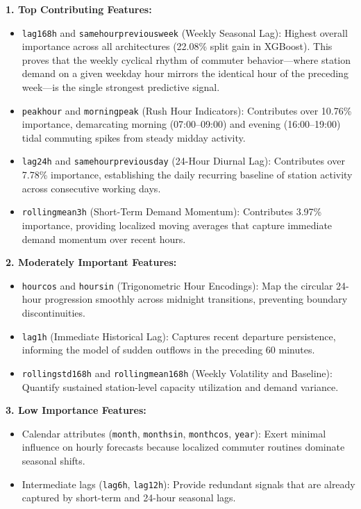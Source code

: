 \documentclass[12pt, a4paper]{article}
\renewcommand{\_}{\textunderscore\allowbreak}
\begin{document}
\noindent \textbf{1. Top Contributing Features:}
\begin{itemize}
    \item \texttt{lag\_168h} and \texttt{same\_hour\_previous\_week} (Weekly Seasonal Lag): Highest overall importance across all architectures (22.08\% split gain in XGBoost). This proves that the weekly cyclical rhythm of commuter behavior---where station demand on a given weekday hour mirrors the identical hour of the preceding week---is the single strongest predictive signal.
    \item \texttt{peak\_hour} and \texttt{morning\_peak} (Rush Hour Indicators): Contributes over 10.76\% importance, demarcating morning (07:00--09:00) and evening (16:00--19:00) tidal commuting spikes from steady midday activity.
    \item \texttt{lag\_24h} and \texttt{same\_hour\_previous\_day} (24-Hour Diurnal Lag): Contributes over 7.78\% importance, establishing the daily recurring baseline of station activity across consecutive working days.
    \item \texttt{rolling\_mean\_3h} (Short-Term Demand Momentum): Contributes 3.97\% importance, providing localized moving averages that capture immediate demand momentum over recent hours.
\end{itemize}

\noindent \textbf{2. Moderately Important Features:}
\begin{itemize}
    \item \texttt{hour\_cos} and \texttt{hour\_sin} (Trigonometric Hour Encodings): Map the circular 24-hour progression smoothly across midnight transitions, preventing boundary discontinuities.
    \item \texttt{lag\_1h} (Immediate Historical Lag): Captures recent departure persistence, informing the model of sudden outflows in the preceding 60 minutes.
    \item \texttt{rolling\_std\_168h} and \texttt{rolling\_mean\_168h} (Weekly Volatility and Baseline): Quantify sustained station-level capacity utilization and demand variance.
\end{itemize}

\noindent \textbf{3. Low Importance Features:}
\begin{itemize}
    \item Calendar attributes (\texttt{month}, \texttt{month\_sin}, \texttt{month\_cos}, \texttt{year}): Exert minimal influence on hourly forecasts because localized commuter routines dominate seasonal shifts.
    \item Intermediate lags (\texttt{lag\_6h}, \texttt{lag\_12h}): Provide redundant signals that are already captured by short-term and 24-hour seasonal lags.
\end{itemize}
\end{document}

